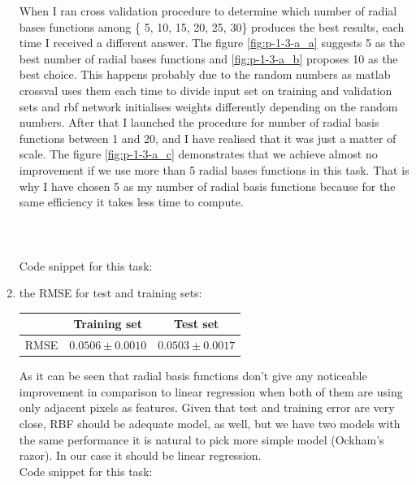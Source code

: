 \documentclass{article}
\begin{document}
\begin{enumerate}[label=(\alph*)]
\begin{figure}[htbp]
				 	\end{figure}	
				 	When I ran cross validation procedure to determine which number of radial bases functions among \{ 5, 10, 15, 20, 25, 30\} produces the best results, each time I received a different answer.  The figure \ref{fig:p-1-3-a_a} suggests 5 as the best number of radial bases functions and \ref{fig:p-1-3-a_b} proposes 10 as the best choice. This happens probably due to the random numbers as matlab crossval uses them each time to divide input set on training and validation sets and rbf network initialises weights differently depending on the random numbers. After that I launched the procedure for number of radial basis functions between 1 and 20, and I have realised that it was just a matter of scale. The figure \ref{fig:p-1-3-a_c} demonstrates that we achieve almost no improvement if we use more than 5 radial bases functions in this task. That is why I have chosen 5 as my number of radial basis functions because for the same efficiency it takes less time to compute.\\ \\ \\ \\
				 	Code snippet for this task:
				 	
				 \item
					the RMSE for test and training sets:
					\begin{center}
						\begin{tabular}{| c | c | c |}
							\hline
							\, & Training set & Test set \\ \hline
							RMSE  & $0.0506 \pm 0.0010$ & $0.0503 \pm 0.0017$ \\ 
							\hline
						\end{tabular}
					\end{center}
					As it can be seen that radial basis functions don't give any noticeable improvement in comparison to linear regression when both of them are using only adjacent pixels as features. Given that test and training error are very close, RBF should be adequate model, as well, but we have two models with the same performance it is natural to pick more simple model (Ockham's razor). In our case it should be linear regression. \\
				 	Code snippet for this task:
				 	
			\end{enumerate}
			 
\end{document}
